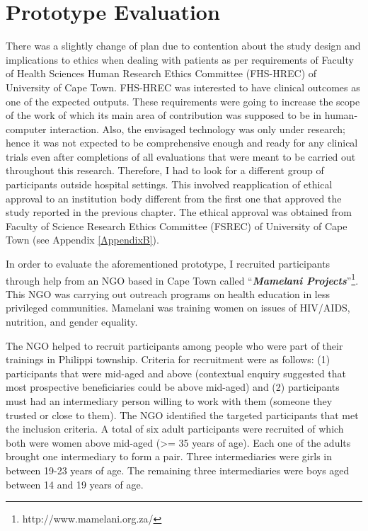 \section{Prototype Evaluation}
There was a slightly change of plan  due to contention about the study design and implications to ethics when dealing with patients as per requirements of Faculty of Health Sciences Human Research Ethics Committee (FHS-HREC) of University of Cape Town. FHS-HREC was interested to have clinical outcomes as one of the expected outputs. These requirements were going to increase the scope of the work of which its main area of contribution was supposed to be in human-computer interaction. Also, the envisaged technology was only under research; hence it was not expected to be comprehensive enough and ready for any clinical trials even after completions of all evaluations that were meant to be carried out throughout this research. Therefore, I had to look for a different group of participants outside hospital settings. This involved reapplication of ethical approval to an institution body different from the first one that approved the study reported in the previous chapter. The ethical approval was obtained from Faculty of Science Research Ethics Committee (FSREC) of University of Cape Town (see Appendix \ref{AppendixB}).

In order to evaluate the aforementioned prototype, I recruited participants through help from an NGO
based in Cape Town called ``\textbf{\textit{Mamelani Projects}}''\footnote{http://www.mamelani.org.za/}. This NGO was carrying out outreach programs on health education in less privileged
communities. Mamelani was training women on issues of HIV/AIDS, nutrition, and gender equality. 

The NGO helped to recruit participants among people who were part of their trainings in Philippi township. Criteria for recruitment were as follows: (1) participants that were mid-aged and above (contextual enquiry suggested that most prospective beneficiaries could be above mid-aged) and (2) participants must had an intermediary person willing to work with them (someone they trusted or close to them). The NGO identified the targeted participants that met the inclusion criteria. A total of six adult participants were recruited of which both were women above mid-aged (\textgreater= 35 years of age). Each one of the adults brought one intermediary to form a pair. Three intermediaries were girls in between 19-23 years of age. The remaining three intermediaries were boys aged between 14 and 19 years of age. 

